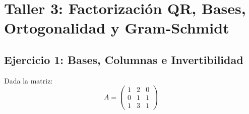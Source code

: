\documentclass[11pt,a4paper]{article}
\theoremstyle{definition}
\theoremstyle{remark}
\begin{document}
\newpage
\section{Taller 3: Factorización QR, Bases, Ortogonalidad y Gram-Schmidt}

\subsection{Ejercicio 1: Bases, Columnas e Invertibilidad}
Dada la matriz:
\begin{equation}
    A = \begin{pmatrix}
        1 & 2 & 0 \\
        0 & 1 & 1 \\
        1 & 3 & 1
    \end{pmatrix}
\end{equation}
\end{document}
